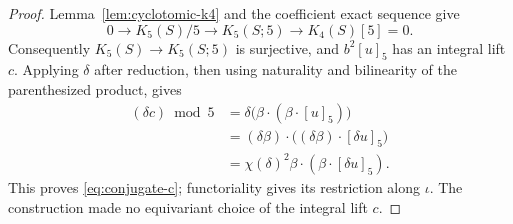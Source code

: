 \begin{proof}
Lemma~\ref{lem:cyclotomic-k4} and the coefficient exact sequence give
\[
 0\longrightarrow K_5(S)/5\longrightarrow K_5(S;5)
 \longrightarrow K_4(S)[5]=0.
\]
Consequently $K_5(S)\to K_5(S;5)$ is surjective, and
$b^2[u]_5$ has an integral lift $c$.  Applying $\delta$ after reduction,
then using naturality and bilinearity of the parenthesized product, gives
\[
 \begin{aligned}
 (\delta c)\bmod5
 &=\delta\bigl(\beta\cdot(\beta\cdot[u]_5)\bigr)\\
 &=(\delta\beta)\cdot\bigl((\delta\beta)\cdot[\delta u]_5\bigr)\\
 &=\chi(\delta)^2\beta\cdot(\beta\cdot[\delta u]_5).
 \end{aligned}
\]
This proves \eqref{eq:conjugate-c}; functoriality gives its restriction
along $\iota$.  The construction made no equivariant choice of the
integral lift $c$.
\end{proof}
